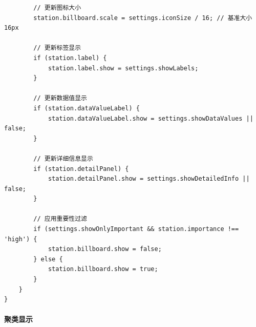 \begin{lstlisting}
        // 更新图标大小
        station.billboard.scale = settings.iconSize / 16; // 基准大小16px
        
        // 更新标签显示
        if (station.label) {
            station.label.show = settings.showLabels;
        }
        
        // 更新数据值显示
        if (station.dataValueLabel) {
            station.dataValueLabel.show = settings.showDataValues || false;
        }
        
        // 更新详细信息显示
        if (station.detailPanel) {
            station.detailPanel.show = settings.showDetailedInfo || false;
        }
        
        // 应用重要性过滤
        if (settings.showOnlyImportant && station.importance !== 'high') {
            station.billboard.show = false;
        } else {
            station.billboard.show = true;
        }
    }
}
\end{lstlisting}

\paragraph{聚类显示}\label{ux805aux7c7bux663eux793a}

